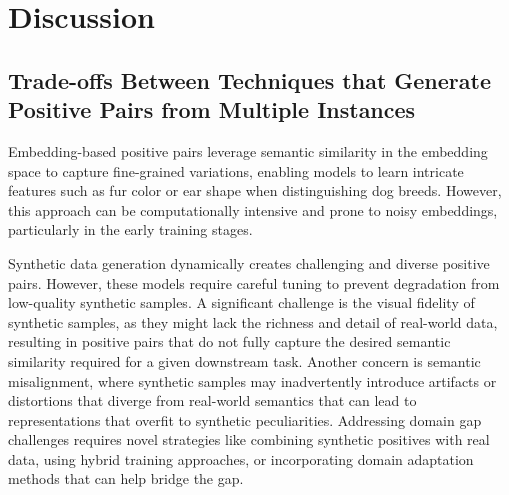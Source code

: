 \section{Discussion}



\subsection{Trade-offs Between Techniques that Generate Positive Pairs from Multiple Instances}

Embedding-based positive pairs leverage semantic similarity in the embedding space to capture fine-grained variations, enabling models to learn intricate features such as fur color or ear shape when distinguishing dog breeds. However, this approach can be computationally intensive and prone to noisy embeddings, particularly in the early training stages.

Synthetic data generation dynamically creates challenging and diverse positive pairs. However, these models %
require careful tuning to prevent degradation from low-quality synthetic samples. A significant challenge is the visual fidelity of synthetic samples, as they might lack the richness and detail of real-world data, resulting in positive pairs that do not fully capture the desired semantic similarity required for a given downstream task. 
Another concern is semantic misalignment, where synthetic samples may inadvertently introduce artifacts or distortions that diverge from real-world semantics that can lead to representations that overfit to synthetic peculiarities. Addressing domain gap challenges requires novel strategies like combining synthetic positives with real data, using hybrid training approaches, or incorporating domain adaptation methods that can help bridge the gap.

